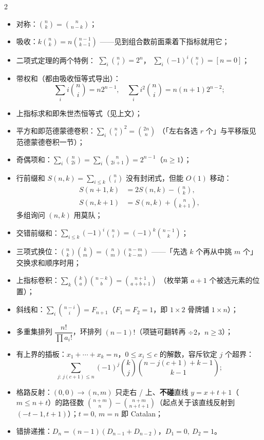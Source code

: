 \begin{multicols*}{2}
		\begin{itemize}
			\item 对称：$\binom{n}{k} = \binom{n}{n-k}$；
			\item 吸收：$k\binom{n}{k} = n\binom{n-1}{k-1}$
			      ——见到组合数前面乘着下指标就用它；
			\item 二项式定理的两个特例：
			      $\sum_{i}\binom{n}{i} = 2^n$，
			      $\sum_{i}(-1)^i\binom{n}{i} = [n = 0]$；
			\item 带权和（都由吸收恒等式导出）：
			      \[
			        \sum_{i}i\binom{n}{i} = n2^{n-1},\quad
			        \sum_{i}i^{2}\binom{n}{i} = n(n+1)2^{n-2};
			      \]
			\item 上指标求和即朱世杰恒等式（见上文）；
			\item 平方和即范德蒙德卷积：$\sum_i\binom{n}{i}^2 = \binom{2n}{n}$
			      （「左右各选 $r$ 个」与平移版见范德蒙德卷积一节）；
			\item 奇偶项和：$\sum_i\binom{n}{2i} = \sum_i\binom{n}{2i+1} = 2^{n-1}$（$n\ge1$）；
			\item 行前缀和 $S(n,k)=\sum_{i\le k}\binom{n}{i}$ 没有封闭式，但能 $O(1)$ 移动：
			      \[
			        \begin{aligned}
			        	S(n+1,k) &= 2S(n,k)-\binom{n}{k},\\
			        	S(n,k+1) &= S(n,k)+\binom{n}{k+1},
			        \end{aligned}
			      \]
			      多组询问 $(n,k)$ 用莫队；
			\item 交错前缀和：$\sum_{i\le k}(-1)^i\binom{n}{i} = (-1)^k\binom{n-1}{k}$；
			\item 三项式换位：$\binom{n}{k}\binom{k}{m} = \binom{n}{m}\binom{n-m}{k-m}$
			      ——「先选 $k$ 个再从中挑 $m$ 个」交换求和顺序时用；
			\item 上指标卷积：$\sum_{k}\binom{k}{a}\binom{n-k}{b} = \binom{n+1}{a+b+1}$
			      （枚举第 $a+1$ 个被选元素的位置）；
			\item 斜线和：$\sum_i\binom{n-i}{i} = F_{n+1}$（$F_1=F_2=1$，即 $1\times2$ 骨牌铺 $1\times n$）；
			\item 多重集排列 $\dfrac{n!}{\prod a_i!}$，环排列 $(n-1)!$（项链可翻转再 $\div 2$，$n\ge3$）；
			\item 有上界的插板：$x_1+\cdots+x_k=n$，$0\le x_i\le c$ 的解数，容斥钦定 $j$ 个超界：
			      \[
			        \sum_{j:\,j(c+1)\le n}(-1)^j\binom{k}{j}\binom{n-j(c+1)+k-1}{k-1};
			      \]
			\item 格路反射：$(0,0)\to(n,m)$ 只走右 / 上、\textbf{不碰}直线 $y=x+t+1$（$m\le n+t$）的路径数
			      $\binom{n+m}{n}-\binom{n+m}{n+t+1}$（起点关于该直线反射到 $(-t-1,t+1)$）；$t=0,\,m=n$ 即 Catalan；
			\item 错排递推：$D_n=(n-1)(D_{n-1}+D_{n-2})$，$D_1=0,\ D_2=1$。
		\end{itemize}


\end{multicols*}
